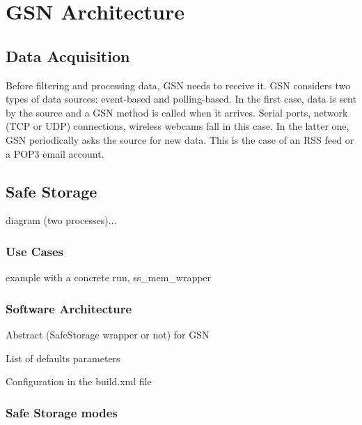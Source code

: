 \graphicspath{{chapters/ch-architecture/figures/}}

\chapter{GSN Architecture}

\section{Data Acquisition}

 Before filtering and processing data, GSN needs to receive it. GSN considers two types of data sources: event-based and polling-based.
 In the first case, data is sent by the source and a GSN method is called when it arrives.
 Serial ports, network (TCP or UDP) connections, wireless webcams fall in this case. In the latter one, GSN periodically asks the 
 source for new data. This is the case of an RSS feed or a POP3 email account.

\section{Safe Storage}




diagram (two processes)...

\subsection{Use Cases}
example with a concrete run, ss\_mem\_wrapper

\subsection{Software Architecture}

Abstract (SafeStorage wrapper or not) for GSN

List of defaults parameters

Configuration in the build.xml file

\subsection{Safe Storage modes}

